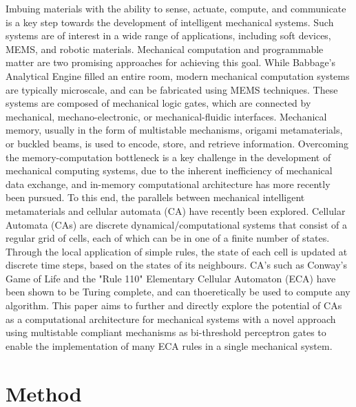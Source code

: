 Imbuing materials with the ability to sense, actuate, compute, and communicate is a key step towards the development of intelligent mechanical systems\cite{McEvoy2015}. 
Such systems are of interest in a wide range of applications, including soft devices, MEMS, and robotic materials. 
Mechanical computation and programmable matter\cite{Roukes2004,Florijn2014,Margolus1996,Waheed2022} are two promising approaches for achieving this goal. 
While Babbage's Analytical Engine\cite{Yasuda2021} filled an entire room, modern mechanical computation systems are typically microscale, and can be fabricated using MEMS techniques\cite{Mei2021}. 
These systems are composed of mechanical logic gates\cite{Merkle2018,Merkle1993,Waheed2020}, which are connected by mechanical, mechano-electronic, or mechanical-fluidic interfaces\cite{Preston2019}. 
Mechanical memory\cite{Mei2021}, usually in the form of multistable mechanisms\cite{Gou2021}, origami metamaterials\cite{Liu2023}, or buckled beams\cite{Mei2023}, is used to encode, store, and retrieve information. 
Overcoming the memory-computation bottleneck is a key challenge in the development of mechanical computing systems, due to the inherent inefficiency of mechanical data exchange, and in-memory computational architecture has more recently been pursued\cite{Mei2023,Liu2022,Kwakernaak2022}.
To this end, the parallels between mechanical intelligent metamaterials and cellular automata (CA) have recently been explored\cite{Mei2021,Kwakernaak2022}. Cellular Automata (CAs) are discrete dynamical/computational systems that consist of a regular grid of cells, each of which can be in one of a finite number of states. Through the local application of simple rules, the state of each cell is updated at discrete time steps, based on the states of its neighbours\cite{Wolfram1984,Wolfram2002}. CA's such as Conway's Game of Life\cite{Life} and the "Rule 110" Elementary Cellular Automaton (ECA)\cite{Wolfram1984} have been shown to be Turing complete, and can thoeretically be used to compute any algorithm\cite{Lifewiki,Cook1985}.
This paper aims to further and directly explore the potential of CAs as a computational architecture for mechanical systems 
with a novel approach using multistable compliant mechanisms as bi-threshold perceptron gates to enable the implementation of many ECA rules in a single mechanical system.







\section{Method}

